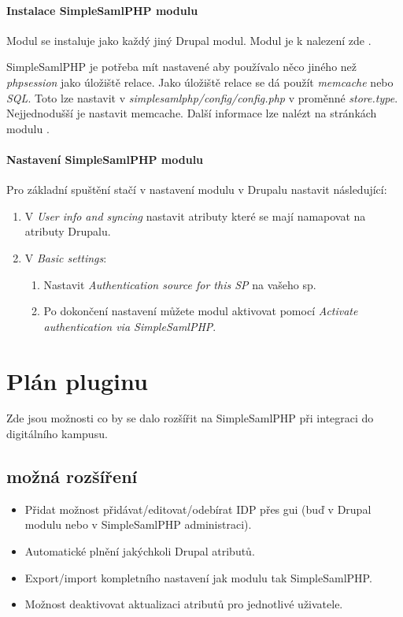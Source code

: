 \subsubsection{Instalace SimpleSamlPHP modulu} %

Modul se instaluje jako každý jiný Drupal modul. Modul je k nalezení zde \cite{SimpleSAMLphpDrupal}.

SimpleSamlPHP je potřeba mít nastavené aby používalo něco jiného než \emph{phpsession} jako úložiště relace. Jako úložiště relace se dá použít \emph{memcache} nebo \emph{SQL}.
Toto lze nastavit v \emph{simplesamlphp/config/config.php} v proměnné \emph{store.type}.
Nejjednodušší je nastavit memcache. Další informace lze nalézt na stránkách modulu \cite{SimpleSAMLphpDrupal}.

\subsubsection{Nastavení SimpleSamlPHP modulu} %

Pro základní spuštění stačí v nastavení modulu v Drupalu nastavit následující:

\begin{enumerate}
    \item V \emph{User info and syncing} nastavit atributy které se mají namapovat na atributy Drupalu.
    \item V \emph{Basic settings}:
    \begin{enumerate}
        \item Nastavit \emph{Authentication source for this SP} na vašeho sp.
        \item Po dokončení nastavení můžete modul aktivovat pomocí \emph{Activate authentication via SimpleSamlPHP}.
    \end{enumerate}

\end{enumerate}

\chapter{Plán pluginu}

Zde jsou možnosti co by se dalo rozšířit na SimpleSamlPHP při integraci do digitálního kampusu.

\section{možná rozšíření}

\begin{itemize}
    \item Přidat možnost přidávat/editovat/odebírat IDP přes gui (buď v Drupal modulu nebo v SimpleSamlPHP administraci).
    \item Automatické plnění jakýchkoli Drupal atributů.
    \item Export/import kompletního nastavení jak modulu tak SimpleSamlPHP.
    \item Možnost deaktivovat aktualizaci atributů pro jednotlivé uživatele.
\end{itemize}

